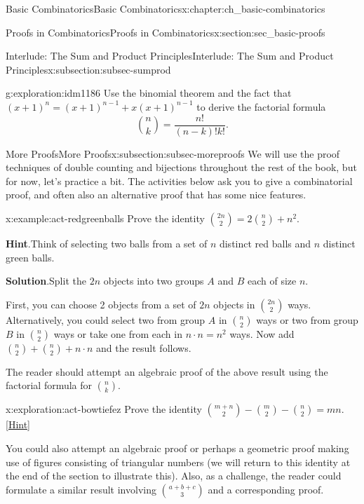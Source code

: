 \documentclass[oneside,10pt,]{book}
\numberwithin{equation}{chapter}
\begin{document}
\begin{chapterptx}{Basic Combinatorics}{}{Basic Combinatorics}{}{}{x:chapter:ch_basic-combinatorics}
\begin{sectionptx}{Proofs in Combinatorics}{}{Proofs in Combinatorics}{}{}{x:section:sec_basic-proofs}
\begin{subsectionptx}{Interlude: The Sum and Product Principles}{}{Interlude: The Sum and Product Principles}{}{}{x:subsection:subsec-sumprod}
\begin{exploration}{}{g:exploration:idm1186}
Use the binomial theorem and the fact that \((x+1)^n = (x+1)^{n-1} + x(x+1)^{n-1}\) to derive the factorial formula%
\begin{equation*}
\binom{n}{k} = \frac{n!}{(n-k)!k!}\text{.}
\end{equation*}
%
\end{exploration}
\end{subsectionptx}
%
%
\typeout{************************************************}
\typeout{************************************************}
%
\begin{subsectionptx}{More Proofs}{}{More Proofs}{}{}{x:subsection:subsec-moreproofs}
We will use the proof techniques of double counting and bijections throughout the rest of the book, but for now, let's practice a bit.  The activities below ask you to give a combinatorial proof, and often also an alternative proof that has some nice features.%
\begin{example}{}{x:example:act-redgreenballs}%
Prove the identity \(\binom{2n}{2} = 2 \binom{n}{2} + n^{2}\).%
\par\smallskip%
\noindent\textbf{Hint}.\hypertarget{g:hint:idm1198}{}\quad{}Think of selecting two balls from a set of \(n\) distinct red balls and \(n\) distinct green balls.%
\par\smallskip%
\noindent\textbf{Solution}.\hypertarget{g:solution:idm1202}{}\quad{}Split the \(2n\) objects into two groups \(A\) and \(B\) each of size \(n\).%
\par
First, you can choose 2 objects from a set of \(2n\) objects in \(\binom{2n}{2}\) ways. Alternatively, you could select two from group \(A\) in \(\binom{n}{2}\) ways or two from group \(B\) in \(\binom{n}{2}\) ways or take one from each in \(n \cdot n = n^{2}\) ways. Now add \(\binom{n}{2} + \binom{n}{2}+ n \cdot n\) and the result follows.%
\end{example}
The reader should attempt an algebraic proof of the above result using the factorial formula for \(\binom{n}{k}\).%
\begin{exploration}{}{x:exploration:act-bowtiefez}%
Prove the identity \(\binom{m + n}{2} - \binom{m}{2} - \binom{n}{2} = mn\).%
\space\hspace*{0pt}\hfill{\tiny\hyperlink{g:hint:idm1223-back}{[Hint]}}\end{exploration}
You could also attempt an algebraic proof or perhaps a geometric proof making use of figures consisting of triangular numbers (we will return to this identity at the end of the section to illustrate this). Also, as a challenge, the reader could formulate a similar result involving \(\binom{a + b + c}{3}\) and a corresponding proof.%

\end{subsectionptx}
\end{sectionptx}
\end{chapterptx}
\end{document}
